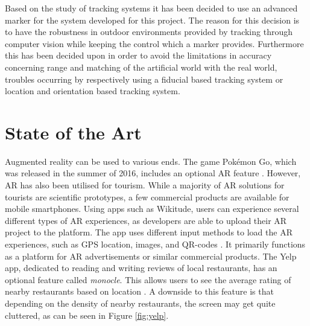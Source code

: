Based on the study of tracking systems it has been decided to use an advanced marker for the system developed for this project. The reason for this decision is to have the robustness in outdoor environments provided by tracking through computer vision while keeping the control which a marker provides. Furthermore this has been decided upon in order to avoid the limitations in accuracy concerning range and matching of the artificial world with the real world, troubles occurring by respectively using a fiducial based tracking system or location and orientation based tracking system.


\section{State of the Art}
Augmented reality can be used to various ends. The game Pokémon Go, which was released in the summer of 2016, includes an optional AR feature \cite{Pokemon}. However, AR has also been utilised for tourism. While a majority of AR solutions for tourists are scientific prototypes, a few commercial products are available for mobile smartphones. Using apps such as Wikitude, users can experience several different types of AR experiences, as developers are able to upload their AR project to the platform. The app uses different input methods to load the AR experiences, such as GPS location, images, and QR-codes \cite{Wikitude}. It primarily functions as a platform for AR advertisements or similar commercial products. The Yelp app, dedicated to reading and writing reviews of local restaurants, has an optional feature called \textit{monocle}. This allows users to see the average rating of nearby restaurants based on location \cite{Yelp}. A downside to this feature is that depending on the density of nearby restaurants, the screen may get quite cluttered, as can be seen in Figure \ref{fig:yelp}.\pagebreak

